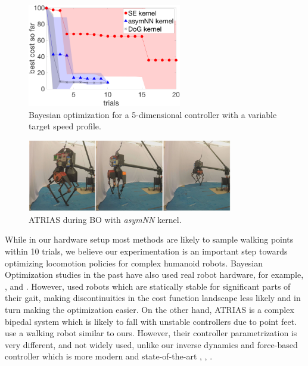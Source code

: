 \begin{figure}
    \centering
    \includegraphics[width = 0.6\textwidth]{img/bo_nn_all_3.png}
    \caption{Bayesian optimization for a 5-dimensional controller with a variable target speed profile.}
    \label{fig:bo_nn_all_3}
\end{figure}


\begin{figure}[t]
\centering
\includegraphics[width=0.8\textwidth]{img/atrias_walk_slides.jpg}
\caption{ATRIAS during BO with \textit{asymNN} kernel.}
\label{fig:bo_runs_atrias_hw_slides}
\end{figure}




While in our hardware setup most methods are likely to sample walking points within 10 trials, we believe our experimentation is an important step towards optimizing locomotion policies for complex humanoid robots. Bayesian Optimization studies in the past have also used real robot hardware, for example, \cite{Calandra2016}, \cite{cully2015robots} and \cite{tesch}.
However, \cite{tesch, lizotte2007automatic, cully2015robots} used robots which are statically stable for significant parts of their gait, making discontinuities in the cost function landscape less likely and in turn making the optimization easier. On the other hand, ATRIAS is a complex bipedal system which is likely to fall with unstable controllers due to point feet. \cite{Calandra2016} use a walking robot similar to ours. However, their controller parametrization is very different, and not widely used, unlike our inverse dynamics and force-based controller which is more modern and state-of-the-art \cite{kuindersma2016optimization}, \cite{herzog2016momentum}, \cite{feng2015optimization}. 

